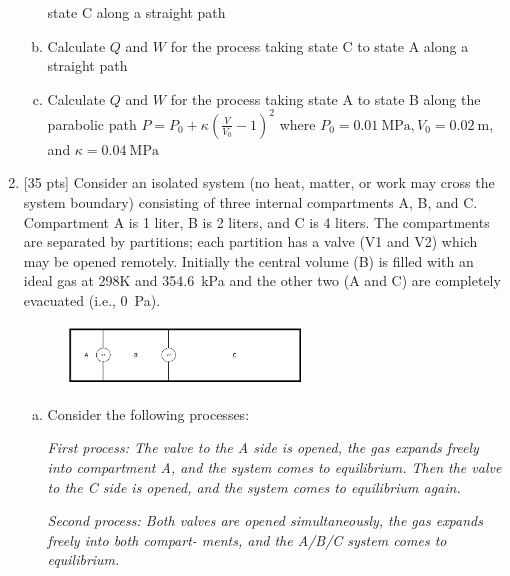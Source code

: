 \begin{enumerate}
\begin{enumerate}[(a)]
        state C along a straight path
      \item Calculate $Q$ and $W$ for the process taking state C to
        state A along a straight path
      \item Calculate $Q$ and $W$ for the process taking state A to
        state B along the parabolic path $P = P_0 +
        \kappa\left(\frac{V}{V_0} - 1\right)^2$ where
        $P_0 = \SI{0.01}{\mega\pascal}, V_0 = \SI{0.02}{\meter}$, and
        $\kappa = \SI{0.04}{\mega\pascal}$
    \end{enumerate}
  \item  {[35 pts]} Consider an isolated system (no heat, matter, or
    work may cross the system boundary)
    consisting of three internal compartments A, B, and C.
    Compartment A is 1 liter, B is 2 liters, and
    C is 4 liters. The compartments are separated by partitions; each
    partition has a valve (V1 and V2)
    which may be opened remotely. Initially the central volume (B) is
    filled with an ideal gas at 298K and
    \SI{354.6}{\kilo\pascal} and the other two (A and C) are
    completely evacuated (i.e., \SI{0}{\pascal}).

    \begin{figure}[h]
      \centering
      \includegraphics[width=0.6\textwidth]{./assets/q_4_fig.png}
    \end{figure}

    \begin{enumerate}[(a)]
      \item Consider the following processes:

        \textit{First process: The valve to the A side is opened, the gas
          expands freely into compartment A, and
          the system comes to equilibrium. Then the valve to the C side
          is opened, and the system comes
        to equilibrium again.}

        \hspace{0.5 cm}

        \textit{Second process: Both valves are opened simultaneously, the
          gas expands freely into both compart-
        ments, and the A/B/C system comes to equilibrium.}

        \hspace{0.5 cm}


\end{enumerate}
\end{enumerate}
